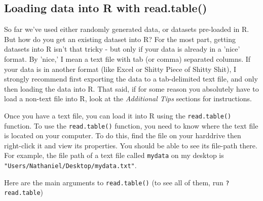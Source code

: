 \documentclass{tufte-book}\usepackage[]{graphicx}\usepackage[]{color}
\newcommand{\newfun}[1]{\begin{LARGE} \begin{center} \texttt{#1} \end{center} \end{LARGE}}
\begin{document}
\begin{footnotesize}
\section{Loading data into R with read.table()}

So far we've used either randomly generated data, or datasets pre-loaded in R. But how do you get an existing dataset into R? For the most part, getting datasets into R isn't that tricky - but only if your data is already in a 'nice' format. By 'nice,' I mean a text file with tab (or comma) separated columns. If your data is in another format (like Excel or Shitty Piece of Shitty Shit), I strongly recommend first exporting the data to a tab-delimited text file, and only then loading the data into R. That said, if for some reason you absolutely have to load a non-text file into R, look at the \textit{Additional Tips} sections for instructions.

Once you have a text file, you can load it into R using the \texttt{read.table()} function. To use the \texttt{read.table()} function, you need to know where the text file is located on your computer. To do this, find the file on your harddrive then right-click it and view its properties. You should be able to see its file-path there. For example, the file path of a text file called \texttt{mydata} on my desktop is \texttt{"Users/Nathaniel/Desktop/mydata.txt"}.

Here are the main arguments to \texttt{read.table()} (to see all of them, run \texttt{?read.table})



\vspace{5mm} %
\noindent
\setlength{\fboxrule}{1.5pt}
\fbox{
\parbox{\textwidth}{

\newfun{read.table()}\index{read.table()}

\hline

\begin{description}


\end{description}}}
\end{footnotesize}
\end{document}
